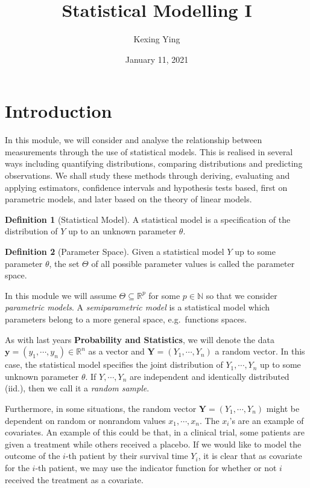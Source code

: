 \documentclass[
]{article}
\title{Statistical Modelling I}
\author{Kexing Ying}
\date{January 11, 2021}
\theoremstyle{definition}
\theoremstyle{definition}
\newtheorem{definition}{Definition}[section]
\begin{document}
\maketitle

{
\hypersetup{linkcolor=}
\setcounter{tocdepth}{2}
\tableofcontents
}
\newpage

\hypertarget{introduction}{%
\section{Introduction}\label{introduction}}

In this module, we will consider and analyse the relationship between
measurements through the use of statistical models. This is realised in
several ways including quantifying distributions, comparing
distributions and predicting observations. We shall study these methods
through deriving, evaluating and applying estimators, confidence
intervals and hypothesis tests based, first on parametric models, and
later based on the theory of linear models.

\begin{definition}[Statistical Model]
  A statistical model is a specification of the distribution of \(Y\) up to an 
  unknown parameter \(\theta\).
\end{definition}

\begin{definition}[Parameter Space]
  Given a statistical model \(Y\) up to some parameter \(\theta\), the set \(\Theta\) 
  of all possible parameter values is called the parameter space.
\end{definition}

In this module we will assume \(\Theta \subseteq \mathbb{R}^p\) for some
\(p \in \mathbb{N}\) so that we consider \emph{parametric models}. A
\emph{semiparametric model} is a statistical model which parameters
belong to a more general space, e.g.~functions spaces.

As with last years \textbf{Probability and Statistics}, we will denote
the data \(\mathbf{y} = (y_1, \cdots, y_n) \in \mathbb{R}^n\) as a
vector and \(\mathbf{Y} = (Y_1, \cdots, Y_n)\) a random vector. In this
case, the statistical model specifies the joint distribution of
\(Y_1, \cdots, Y_n\) up to some unknown parameter \(\theta\). If
\(Y, \cdots, Y_n\) are independent and identically distributed (iid.),
then we call it a \emph{random sample}.

Furthermore, in some situations, the random vector
\(\mathbf{Y} = (Y_1, \cdots, Y_n)\) might be dependent on random or
nonrandom values \(x_1, \cdots, x_n\). The \(x_i\)'s are an example of
covariates. An example of this could be that, in a clinical trial, some
patients are given a treatment while others received a placebo. If we
would like to model the outcome of the \(i\)-th patient by their
survival time \(Y_i\), it is clear that as covariate for the \(i\)-th
patient, we may use the indicator function for whether or not \(i\)
received the treatment as a covariate.
\end{document}

